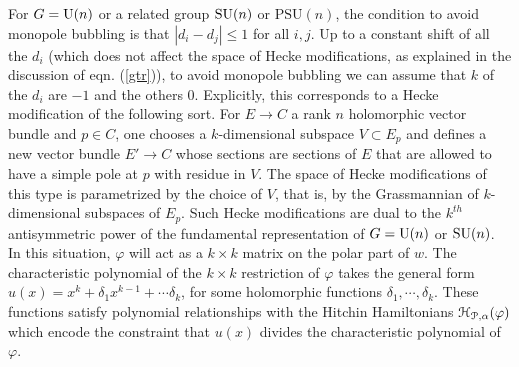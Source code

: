 \documentclass[11pt,a4paper]{article}
\begin{document}
For $G={\mathrm U}(n)$ or a related group ${\mathrm{SU}}(n)$ or $\mathrm{PSU}(n)$, the condition to avoid monopole bubbling is that $|d_i-d_j|\leq 1$ for all $i,j$.
Up to a constant shift of all the $d_i$ (which does not affect the space of Hecke modifications, as explained in the discussion of eqn. (\ref{gtr})), 
to avoid monopole bubbling we can assume that $k$ of the $d_i$ are $-1$ and the others 0.   
Explicitly, this corresponds to a Hecke modification of the following sort.
For $E\to C$ a rank $n$ holomorphic vector bundle and $p\in C$, one chooses a $k$-dimensional subspace $V\subset E_p$ and defines a new vector
bundle $E'\to C$ whose sections are sections of $E$ that are allowed to have a simple pole at $p$ with residue in $V$.   The space of Hecke
modifications of this type is parametrized by the choice of $V$, that is, by the Grassmannian of $k$-dimensional subspaces of $E_p$.
Such Hecke modifications are dual to the $k^{th}$ antisymmetric power of the fundamental representation of $G={\mathrm U}(n)$ or ${\mathrm{SU}}(n)$.   
In this situation,  $\varphi$ will act as a $k \times k$ matrix on the polar part of $w$. The characteristic polynomial of the $k \times k$ restriction of $\varphi$ 
takes the general form $u(x) = x^k + \delta_1 x^{k-1} + \cdots \delta_k$, for some holomorphic functions $\delta_1,\cdots,\delta_k$.   These functions
 satisfy polynomial relationships with the Hitchin Hamiltonians ${\mathcal H}_{{\mathcal P},\alpha}(\varphi)$ which encode the 
constraint that $u(x)$ divides the characteristic polynomial of $\varphi$. 
\end{document}
